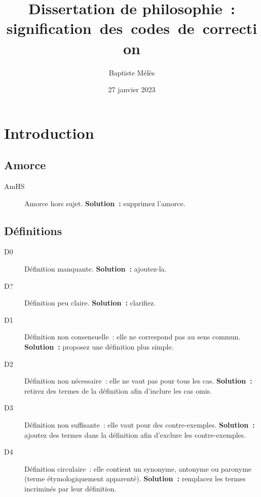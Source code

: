 \documentclass[a4paper,11pt]{article}
\author{Baptiste Mélès}
\date{27 janvier 2023}
\title{Dissertation de philosophie : signification des codes de correction}
\begin{document}
\maketitle

\section{Introduction}
\label{sec:orgfb0ef42}

\subsection{Amorce}
\label{sec:org8959835}
\begin{description}
\item[{AmHS}] Amorce hors sujet. \textbf{Solution :} supprimez l'amorce.
\end{description}

\subsection{Définitions}
\label{sec:orgb0087c4}
\begin{description}
\item[{D0}] Définition manquante. \textbf{Solution :} ajoutez-la.
\item[{D\string?}] Définition peu claire. \textbf{Solution :} clarifiez.
\item[{D1}] Définition non consensuelle : elle ne correspond pas au sens
commun. \textbf{Solution :} proposez une définition plus simple.
\item[{D2}] Définition non nécessaire : elle ne vaut pas pour tous les cas.
\textbf{Solution :} retirez des termes de la définition afin d'inclure les
cas omis.
\item[{D3}] Définition non suffisante : elle vaut pour des contre-exemples.
\textbf{Solution :} ajoutez des termes dans la définition afin d'exclure les
contre-exemples.
\item[{D4}] Définition circulaire : elle contient un synonyme, antonyme ou
paronyme (terme étymologiquement apparenté). \textbf{Solution :} remplacez
les termes incriminés par leur définition.
\end{description}
\end{document}
